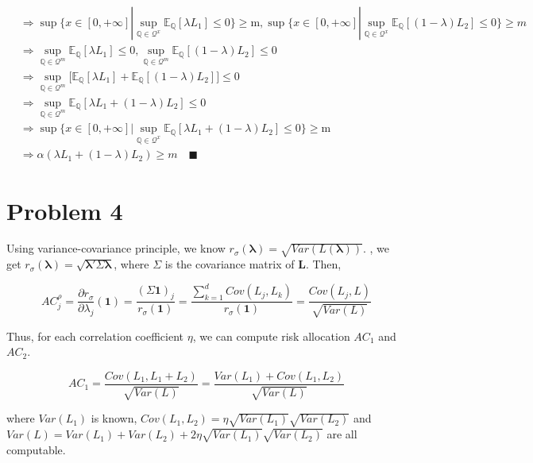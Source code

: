 \documentclass[letterpaper,11pt]{article}
\begin{document}
\begin{spacing}{1.2}
\begin{equation}
\begin{aligned}
&\Rightarrow \sup \Big \{x \in [0,+\infty] | \sup_{\mathbb{Q} \in \mathcal{Q}^x} \mathbb{E}_{\mathbb{Q}}[\lambda L_1] \le 0 \Big \} \ge \mbox{m}, \sup \Big \{ x \in [0,+\infty] | \sup_{\mathbb{Q} \in \mathcal{Q}^x} \mathbb{E}_{\mathbb{Q}}[(1-\lambda) L_2] \le 0 \Big \} \ge m \\
&\Rightarrow \sup_{\mathbb{Q} \in \mathcal{Q}^m} \mathbb{E}_{\mathbb{Q}}[\lambda L_1] \le 0, \sup_{\mathbb{Q} \in \mathcal{Q}^m} \mathbb{E}_{\mathbb{Q}}[(1-\lambda) L_2] \le 0 \\
&\Rightarrow \sup_{\mathbb{Q} \in \mathcal{Q}^m} \Big [ \mathbb{E}_{\mathbb{Q}}[\lambda L_1] + \mathbb{E}_{\mathbb{Q}}[(1-\lambda) L_2] \Big ] \le 0 \\
&\Rightarrow \sup_{\mathbb{Q} \in \mathcal{Q}^m} \mathbb{E}_{\mathbb{Q}}[\lambda L_1 + (1-\lambda) L_2] \le 0 \\
&\Rightarrow \sup \Big \{x \in [0,+\infty] | \sup_{\mathbb{Q} \in \mathcal{Q}^x} \mathbb{E}_{\mathbb{Q}}[\lambda L_1 + (1-\lambda) L_2] \le 0 \Big \} \ge \mbox{m} \\
&\Rightarrow \alpha(\lambda L_1 + (1-\lambda) L_2) \ge m \quad \blacksquare
\end{aligned}
\end{equation}


\section*{Problem 4}
Using variance-covariance principle, we know $r_{\sigma}(\bm{\lambda}) = \sqrt{Var(L(\bm{\lambda}))}$. , we get $r_{\sigma}(\bm{\lambda}) = \sqrt{\bm{\lambda}' \Sigma \bm{\lambda}}$, where $\Sigma$ is the covariance matrix of $\bm{L}$. Then,

$$
AC_j^{\rho} = \frac{\partial r_{\sigma}}{\partial \lambda_j} (\bm{1}) = \frac{(\Sigma \bm{1})_j}{r_{\sigma} (\bm{1})} = \frac{\sum_{k=1}^d Cov(L_j,L_k)}{r_{\sigma}(\bm{1})} = \frac{Cov(L_j,L)}{\sqrt{Var(L)}}
$$

Thus, for each correlation coefficient $\eta$, we can compute risk allocation $AC_1$ and $AC_2$.

$$
AC_1 = \frac{Cov(L_1,L_1+L_2)}{\sqrt{Var(L)}} = \frac{Var(L_1)+Cov(L_1,L_2)}{\sqrt{Var(L)}}
$$

where $Var(L_1)$ is known, $Cov(L_1,L_2) = \eta \sqrt{Var(L_1)} \sqrt{Var(L_2)}$ and $Var(L) = Var(L_1) + Var(L_2) + 2 \eta \sqrt{Var(L_1)} \sqrt{Var(L_2)}$ are all computable.


\end{spacing}
\end{document}
